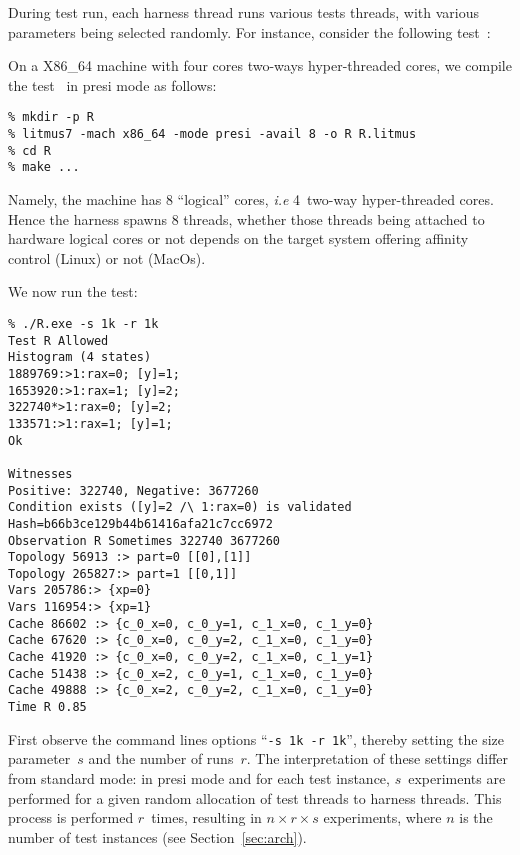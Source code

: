 During test run, each harness thread runs various tests threads,
with various parameters being selected randomly.
For instance, consider the following test~:

On a X86\_64  machine with four cores two-ways hyper-threaded cores,
we compile the test~ in presi mode as follows:
\begin{verbatim}
% mkdir -p R
% litmus7 -mach x86_64 -mode presi -avail 8 -o R R.litmus
% cd R
% make ...
\end{verbatim}
Namely, the machine has 8 ``logical'' cores, \emph{i.e}
4~two-way hyper-threaded cores. Hence the harness spawns 8 threads,
whether those threads being attached to hardware logical cores or not
depends on the target system offering affinity control (Linux) or not (MacOs).

We now run the  test:
\begin{verbatim}
% ./R.exe -s 1k -r 1k
Test R Allowed
Histogram (4 states)
1889769:>1:rax=0; [y]=1;
1653920:>1:rax=1; [y]=2;
322740*>1:rax=0; [y]=2;
133571:>1:rax=1; [y]=1;
Ok

Witnesses
Positive: 322740, Negative: 3677260
Condition exists ([y]=2 /\ 1:rax=0) is validated
Hash=b66b3ce129b44b61416afa21c7cc6972
Observation R Sometimes 322740 3677260
Topology 56913 :> part=0 [[0],[1]]
Topology 265827:> part=1 [[0,1]]
Vars 205786:> {xp=0}
Vars 116954:> {xp=1}
Cache 86602 :> {c_0_x=0, c_0_y=1, c_1_x=0, c_1_y=0}
Cache 67620 :> {c_0_x=0, c_0_y=2, c_1_x=0, c_1_y=0}
Cache 41920 :> {c_0_x=0, c_0_y=2, c_1_x=0, c_1_y=1}
Cache 51438 :> {c_0_x=2, c_0_y=1, c_1_x=0, c_1_y=0}
Cache 49888 :> {c_0_x=2, c_0_y=2, c_1_x=0, c_1_y=0}
Time R 0.85

\end{verbatim}
First observe the command lines options ``\texttt{-s 1k -r 1k}'',
thereby setting the size parameter~$s$  and the number of
runs~$r$. The interpretation of  these settings differ from  standard
mode: in presi mode and for each test instance, $s$~experiments are
performed for a given random allocation of test threads to harness
threads. This process is performed $r$~times, resulting in $n \times
r \times s$ experiments, where $n$ is the number of test instances
(see Section~\ref{sec:arch}).

